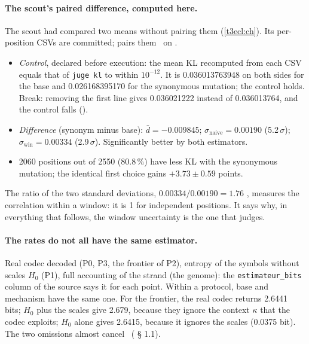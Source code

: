 \paragraph{The scout's paired difference, computed here.} The scout had compared two means without pairing them (\cref{t3ecl:ch}). Its per-position CSVs are committed;  pairs them \calc~on \mes.
\begin{itemize}
\item \emph{Control}, declared before execution: the mean KL recomputed from each CSV equals that of \texttt{juge kl} to within $10^{-12}$. It is \num{0.036013763948} on both sides for the base and \num{0.026168395170} for the synonymous mutation; the control holds. Break: removing the first line gives \num{0.036021222} instead of \num{0.036013764}, and the control falls ().
\item \emph{Difference} (synonym minus base): $\bar d = -0.009845$; $\sigma_{\text{naive}} = 0.00190$ (5.2\,$\sigma$); $\sigma_{\text{win}} = 0.00334$ (2.9\,$\sigma$). Significantly better by both estimators.
\item \num{2060} positions out of \num{2550} (80.8\,\%) have less KL with the synonymous mutation; the identical first choice gains $+3.73 \pm 0.59$ points.
\end{itemize}
The ratio of the two standard deviations, $0.00334/0.00190 = 1.76$ \calc, measures the correlation within a window: it is 1 for independent positions. It says why, in everything that follows, the window uncertainty is the one that judges.

\paragraph{The rates do not all have the same estimator.} Real codec decoded (P0, P3, the frontier of P2), entropy of the symbols without scales $H_0$ (P1), full accounting of the strand (the genome): the \texttt{estimateur\_bits} column of the source says it for each point. Within a protocol, base and mechanism have the same one. For the frontier, the real codec returns \num{2.6441} bits; $H_0$ plus the scales give \num{2.679}, because they ignore the context $\kappa$ that the codec exploits; $H_0$ alone gives \num{2.6415}, because it ignores the scales (\num{0.0375} bit). The two omissions almost cancel \calc~( § 1.1).

